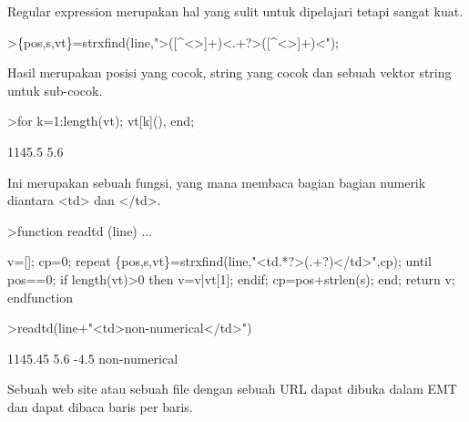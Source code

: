 \documentclass[a4paper,10pt]{article}
\begin{document}
\begin{eulernotebook}
\begin{eulercomment}
\begin{eulercomment}
\begin{eulercomment}
\begin{eulercomment}
\begin{eulercomment}
\begin{eulercomment}
\begin{eulercomment}
Regular expression merupakan hal yang sulit untuk dipelajari tetapi
sangat kuat.
\end{eulercomment}
\begin{eulerprompt}
>\{pos,s,vt\}=strxfind(line,">([^<>]+)<.+?>([^<>]+)<");
\end{eulerprompt}
\begin{eulercomment}
Hasil merupakan posisi yang cocok, string yang cocok dan sebuah vektor
string untuk sub-cocok.
\end{eulercomment}
\begin{eulerprompt}
>for k=1:length(vt); vt[k](), end;
\end{eulerprompt}
\begin{euleroutput}
  1145.5
  5.6
\end{euleroutput}
\begin{eulercomment}
Ini merupakan sebuah fungsi, yang mana membaca bagian bagian numerik
diantara \textless{}td\textgreater{} dan \textless{}/td\textgreater{}.
\end{eulercomment}
\begin{eulerprompt}
>function readtd (line) ...
\end{eulerprompt}
\begin{eulerudf}
  v=[]; cp=0;
  repeat
     \{pos,s,vt\}=strxfind(line,"<td.*?>(.+?)</td>",cp);
     until pos==0;
     if length(vt)>0 then v=v|vt[1]; endif;
     cp=pos+strlen(s);
  end;
  return v;
  endfunction
\end{eulerudf}
\begin{eulerprompt}
>readtd(line+"<td>non-numerical</td>")
\end{eulerprompt}
\begin{euleroutput}
  1145.45
  5.6
  -4.5
  non-numerical
\end{euleroutput}
\begin{eulercomment}
Sebuah web site atau sebuah file dengan sebuah URL dapat dibuka dalam
EMT dan dapat dibaca baris per baris.


\end{eulercomment}
\end{eulercomment}
\end{eulercomment}
\end{eulercomment}
\end{eulercomment}
\end{eulercomment}
\end{eulercomment}
\end{eulernotebook}
\end{document}
